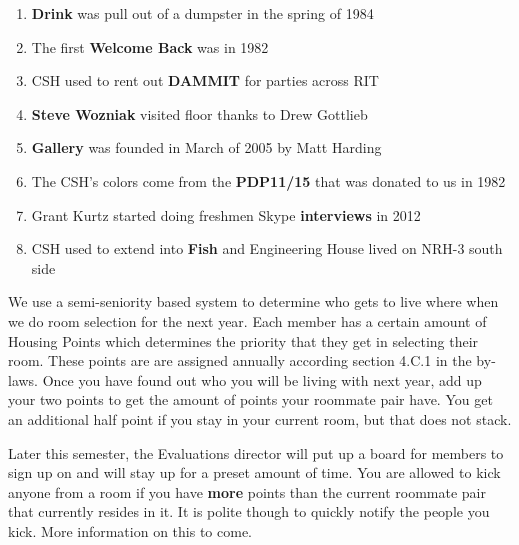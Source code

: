 \documentclass[9pt]{extarticle} %
\begin{document}
\begin{minipage}[t]{.61\linewidth}
\begin{enumerate}
\item \textbf{Drink} was pull out of a dumpster in the spring of 1984
\item The first \textbf{Welcome Back} was in 1982
\item CSH used to rent out \textbf{DAMMIT} for parties across RIT
\item \textbf{Steve Wozniak} visited floor thanks to Drew Gottlieb
\item \textbf{Gallery} was founded in March of 2005 by Matt Harding
\item The CSH's colors come from the \textbf{PDP11/15} that was 
donated to us in 1982
\item Grant Kurtz started doing freshmen Skype \textbf{interviews} in 2012
\item CSH used to extend into \textbf{Fish} and Engineering House lived on
NRH-3 south side
\end{enumerate}

\hypertarget{thirdnews}{} 

We use a semi-seniority based system to determine who gets to live 
where when we do room selection for the next year. Each member has a
certain amount of Housing Points which determines the priority that
they get in selecting their room. These points are are assigned annually
according section 4.C.1 in the by-laws. Once you have found out who 
you will be living with next year, add up your two points to get the
amount of points your roommate pair have. You get an additional half
point if you stay in your current room, but that does not stack. 

Later this semester, the Evaluations director will put up a board for members to sign up on and will stay up for a preset amount of time. You are allowed to kick anyone from a room if you have \textbf{more} points than the current roommate pair that currently resides in it. It is polite though to quickly notify the people you kick. More information on this
to come.


\end{minipage} %
\end{document}
